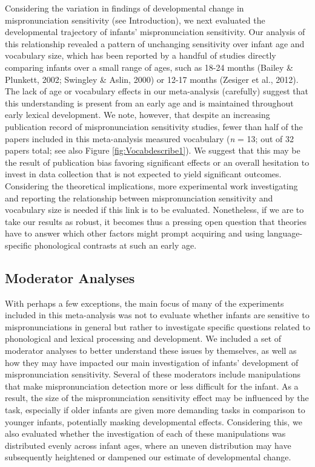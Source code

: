 \documentclass[man, noextraspace]{apa6}
\begin{document}
Considering the variation in findings of developmental change in mispronunciation sensitivity (see Introduction), we next evaluated the developmental trajectory of infants' mispronunciation sensitivity. Our analysis of this relationship revealed a pattern of unchanging sensitivity over infant age and vocabulary size, which has been reported by a handful of studies directly comparing infants over a small range of ages, such as 18-24 months (Bailey \& Plunkett, 2002; Swingley \& Aslin, 2000) or 12-17 months (Zesiger et al., 2012). The lack of age or vocabulary effects in our meta-analysis (carefully) suggest that this understanding is present from an early age and is maintained throughout early lexical development. We note, however, that despite an increasing publication record of mispronunciation sensitivity studies, fewer than half of the papers included in this meta-analysis measured vocabulary (\emph{n} = 13; out of 32 papers total; see also Figure \ref{fig:Vocabdescribe1}). We suggest that this may be the result of publication bias favoring significant effects or an overall hesitation to invest in data collection that is not expected to yield significant outcomes. Considering the theoretical implications, more experimental work investigating and reporting the relationship between mispronunciation sensitivity and vocabulary size is needed if this link is to be evaluated. Nonetheless, if we are to take our results as robust, it becomes thus a pressing open question that theories have to answer which other factors might prompt acquiring and using language-specific phonological contrasts at such an early age.

\hypertarget{moderator-analyses-1}{%
\subsection{Moderator Analyses}\label{moderator-analyses-1}}

With perhaps a few exceptions, the main focus of many of the experiments included in this meta-analysis was not to evaluate whether infants are sensitive to mispronunciations in general but rather to investigate specific questions related to phonological and lexical processing and development. We included a set of moderator analyses to better understand these issues by themselves, as well as how they may have impacted our main investigation of infants' development of mispronunciation sensitivity. Several of these moderators include manipulations that make mispronunciation detection more or less difficult for the infant. As a result, the size of the mispronunciation sensitivity effect may be influenced by the task, especially if older infants are given more demanding tasks in comparison to younger infants, potentially masking developmental effects. Considering this, we also evaluated whether the investigation of each of these manipulations was distributed evenly across infant ages, where an uneven distribution may have subsequently heightened or dampened our estimate of developmental change.
\end{document}
